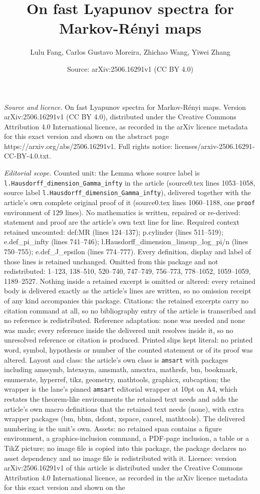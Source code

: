 \documentclass[10pt,a4paper]{amsart}
\title[On fast Lyapunov spectra for Markov-R\'{e}nyi maps]{On fast Lyapunov spectra for Markov-R\'{e}nyi maps}
\author{Lulu Fang, Carlos Gustavo Moreira, Zhichao Wang, Yiwei Zhang}
\date{Source: arXiv:2506.16291v1 (CC BY 4.0)}
\begin{document}
\maketitle

\noindent\emph{Source and licence.} On fast Lyapunov spectra for Markov-R\'{e}nyi maps. Version arXiv:2506.16291v1 (CC BY 4.0), distributed under the Creative Commons Attribution 4.0 International licence, as recorded in the arXiv licence metadata for this exact version and shown on the abstract page https://arxiv.org/abs/2506.16291v1. Full rights notice: licenses/arxiv-2506.16291-CC-BY-4.0.txt.\par\smallskip

\noindent\textit{Editorial scope.} Counted unit: the Lemma whose source label is \texttt{l.Hausdorff\_dimension\_Gamma\_infty} in the article (source0.tex lines 1053--1058, source label \texttt{l.Hausdorff\_dimension\_Gamma\_infty}), delivered together with the article's own complete original proof of it (source0.tex lines 1060--1188, one \texttt{proof} environment of 129 lines). No mathematics is written, repaired or re-derived: statement and proof are the article's own text line for line. Required context retained uncounted: def:MR (lines 124--137); p.cylinder (lines 511--519); e.def\_pi\_infty (lines 741--746); l.Hausdorff\_dimension\_limsup\_log\_pi/n (lines 750--755); e.def\_J\_epsilon (lines 774--777). Every definition, display and label of those lines is retained unchanged. Omitted from this package and not redistributed: 1--123, 138--510, 520--740, 747--749, 756--773, 778--1052, 1059--1059, 1189--2527. Nothing inside a retained excerpt is omitted or altered: every retained body is delivered exactly as the article's lines are written, so no omission receipt of any kind accompanies this package. Citations: the retained excerpts carry no citation command at all, so no bibliography entry of the article is transcribed and no reference is redistributed. Reference adaptation: none was needed and none was made; every reference inside the delivered unit resolves inside it, so no unresolved reference or citation is produced. Printed slips kept literal: no printed word, symbol, hypothesis or number of the counted statement or of its proof was altered. Layout and class: the article's own class is \texttt{amsart} with packages including amssymb, latexsym, amsmath, amsxtra, mathrsfs, bm, bookmark, enumerate, hyperref, tikz, geometry, mathtools, graphicx, subcaption; the wrapper is the lane's pinned \texttt{amsart} editorial wrapper at 10pt on A4, which restates the theorem-like environments the retained text needs and adds the article's own macro definitions that the retained text needs (none), with extra wrapper packages (bm, bbm, dsfont, xspace, cancel, mathtools). The delivered numbering is the unit's own. Assets: no retained span contains a figure environment, a graphics-inclusion command, a PDF-page inclusion, a table or a TikZ picture; no image file is copied into this package, the package declares no asset dependency and no image file is redistributed with it. Licence: version arXiv:2506.16291v1 of this article is distributed under the Creative Commons Attribution 4.0 International licence, as recorded in the arXiv licence metadata for this exact version and shown on the 
\end{document}
